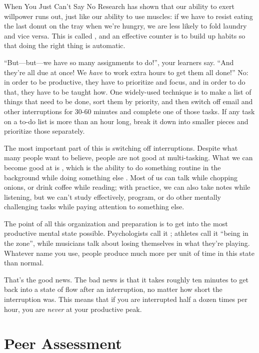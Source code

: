 \begin{aside}{When You Just Can't Say No}
  Research has shown that our ability to exert willpower runs out,
  just like our ability to use muscles: if we have to resist eating
  the last donut on the tray when we're hungry, we are less likely to
  fold laundry and vice versa. This is called  \cite{Mill2016a}, and an effective
  counter is to build up habits so that doing the right thing is
  automatic.
\end{aside}

``But---but---we have so many assignments to do!'', your learners say. ``And
they're all due at once! We \emph{have} to work extra hours to get them all
done!'' No: in order to be productive, they have to prioritize and
focus, and in order to do that, they have to be taught how. One
widely-used technique is to make a list of things that need to be done,
sort them by priority, and then switch off email and other interruptions
for 30-60 minutes and complete one of those tasks. If any task on a
to-do list is more than an hour long, break it down into smaller pieces
and prioritize those separately.

The most important part of this is switching off
interruptions. Despite what many people want to believe, people are
not good at multi-tasking. What we can become good at is
, which is the ability to do something
routine in the background while doing something else
\cite{Mill2016a}. Most of us can talk while chopping onions, or
drink coffee while reading; with practice, we can also take notes
while listening, but we can't study effectively, program, or do other
mentally challenging tasks while paying attention to something else.

The point of all this organization and preparation is to get into the
most productive mental state possible. Psychologists call it
 \cite{Csik2008}; athletes call it ``being in the
zone'', while musicians talk about losing themselves in what they're
playing. Whatever name you use, people produce much more per unit of
time in this state than normal.

That's the good news. The bad news is that it takes roughly ten minutes
to get back into a state of flow after an interruption, no matter how
short the interruption was. This means that if you are interrupted half
a dozen times per hour, you are \emph{never} at your productive peak.

\section{Peer Assessment}\label{s:individual-peer}

